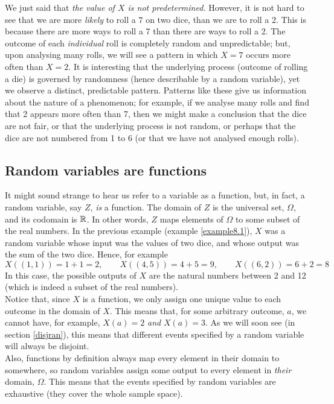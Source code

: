 \noindent We just said that \textit{the value of $X$ is not predetermined.} However, it is not hard to see that we are more \textit{likely} to roll a $7$ on two dice, than we are to roll a $2$. This is because there are more ways to roll a 7 than there are ways to roll a 2. The outcome of each \textit{individual} roll is completely random and unpredictable; but, upon analysing many rolls, we will see a pattern in which $X = 7$ occurs more often than $X = 2$. It is interesting that the underlying process (outcome of rolling a die) is governed by randomness (hence describable by a random variable), yet we observe a distinct, predictable pattern. Patterns like these give us information about the nature of a phenomenon; for example, if we analyse many rolls and find that 2 appears more often than 7, then we might make a conclusion that the dice are not fair, or that the underlying process is not random, or perhaps that the dice are not numbered from 1 to 6 (or that we have not analysed enough rolls).

\subsection{Random variables are functions} \label{sec8.10}
It might sound strange to hear us refer to a variable as a function, but, in fact, a random variable, say $Z$, \textit{is} a function. The domain of $Z$ is the universal set, $\Omega$, and its codomain is $\mathbb{R}$. In other words, $Z$ maps elements of $\Omega$ to some subset of the real numbers. In the previous example (example \ref{example8.1}), $X$ was a random variable whose input was the values of two dice, and whose output was the sum of the two dice. Hence, for example
\[
X((1,1)) = 1 + 1 = 2, \qquad X((4,5)) = 4 + 5 = 9, \qquad X((6,2)) = 6 + 2 = 8
\]
In this case, the possible outputs of $X$ are the natural numbers between 2 and 12 (which is indeed a subset of the real numbers). \\

\noindent Notice that, since $X$ is a function, we only assign one unique value to each outcome in the domain of $X$. This means that, for some arbitrary outcome, $a$, we cannot have, for example, $X(a) = 2$ \textit{and} $X(a) = 3$. As we will soon see (in section \ref{disjran}), this means that different events specified by a random variable will always be disjoint. \\

\noindent Also, functions by definition always map every element in their domain to somewhere, so random variables assign some output to every element in \textit{their} domain, $\Omega$. This means that the events specified by random variables are exhaustive (they cover the whole sample space). \\

